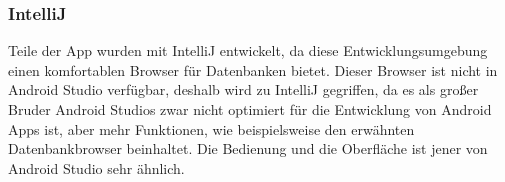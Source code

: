 \documentclass[FIPLY_base.tex]{subfiles}
\begin{document}
\subsubsection{IntelliJ}
Teile der App wurden mit IntelliJ entwickelt, da diese Entwicklungsumgebung einen komfortablen Browser für Datenbanken bietet.
Dieser Browser ist nicht in Android Studio verfügbar, deshalb wird zu IntelliJ gegriffen, da es als großer Bruder Android Studios zwar nicht optimiert für die Entwicklung von Android Apps ist, aber mehr Funktionen, wie beispielsweise den erwähnten Datenbankbrowser beinhaltet. %
Die Bedienung und die Oberfläche ist jener von Android Studio sehr ähnlich. 
\end{document}
